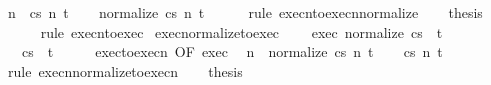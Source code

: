 \begin{isabellebody}
\ n\ \ {\isachardoublequoteopen}{\isasymGamma}{\isasymturnstile}{\isasymlangle}c{\isacharcomma}s{\isasymrangle}\ {\isacharequal}n{\isasymRightarrow}\ t{\isachardoublequoteclose}\isacommand{{\isachardot}{\isachardot}}\isamarkupfalse%
\isanewline
\ \ \isamarkupfalse%
\ {\isachardoublequoteopen}{\isasymGamma}{\isasymturnstile}{\isasymlangle}normalize\ c{\isacharcomma}s{\isasymrangle}\ {\isacharequal}n{\isasymRightarrow}\ t{\isachardoublequoteclose}\isanewline
\ \ \ \ \isamarkupfalse%
\ {\isacharparenleft}rule\ execn{\isacharunderscore}to{\isacharunderscore}execn{\isacharunderscore}normalize{\isacharparenright}\isanewline
\ \ \isamarkupfalse%
\ {\isacharquery}thesis\isanewline
\ \ \ \ \isamarkupfalse%
\ {\isacharparenleft}rule\ execn{\isacharunderscore}to{\isacharunderscore}exec{\isacharparenright}\isanewline
{}\isamarkupfalse%
%
\endisatagproof
{\isafoldproof}%
%
\isadelimproof
\isanewline
%
\endisadelimproof
\isanewline
{}\isamarkupfalse%
\ exec{\isacharunderscore}normalize{\isacharunderscore}to{\isacharunderscore}exec{\isacharcolon}\ \isanewline
\ \ \ exec{\isacharcolon}\ {\isachardoublequoteopen}{\isasymGamma}{\isasymturnstile}{\isasymlangle}normalize\ c{\isacharcomma}s{\isasymrangle}\ {\isasymRightarrow}\ t{\isachardoublequoteclose}\ \isanewline
\ \ \ {\isachardoublequoteopen}{\isasymGamma}{\isasymturnstile}{\isasymlangle}c{\isacharcomma}s{\isasymrangle}\ {\isasymRightarrow}\ t{\isachardoublequoteclose}\isanewline
%
\isadelimproof
%
\endisadelimproof
%
\isatagproof
{}\isamarkupfalse%
\ {\isacharminus}\isanewline
\ \ \isamarkupfalse%
\ exec{\isacharunderscore}to{\isacharunderscore}execn\ {\isacharbrackleft}OF\ exec{\isacharbrackright}\ \isamarkupfalse%
\ n\ \ {\isachardoublequoteopen}{\isasymGamma}{\isasymturnstile}{\isasymlangle}normalize\ c{\isacharcomma}s{\isasymrangle}\ {\isacharequal}n{\isasymRightarrow}\ t{\isachardoublequoteclose}\isacommand{{\isachardot}{\isachardot}}\isamarkupfalse%
\isanewline
\ \ \isamarkupfalse%
\ {\isachardoublequoteopen}{\isasymGamma}{\isasymturnstile}{\isasymlangle}c{\isacharcomma}s{\isasymrangle}\ {\isacharequal}n{\isasymRightarrow}\ t{\isachardoublequoteclose}\isanewline
\ \ \ \ \isamarkupfalse%
\ {\isacharparenleft}rule\ execn{\isacharunderscore}normalize{\isacharunderscore}to{\isacharunderscore}execn{\isacharparenright}\isanewline
\ \ \isamarkupfalse%
\ {\isacharquery}thesis\isanewline

\end{isabellebody}
